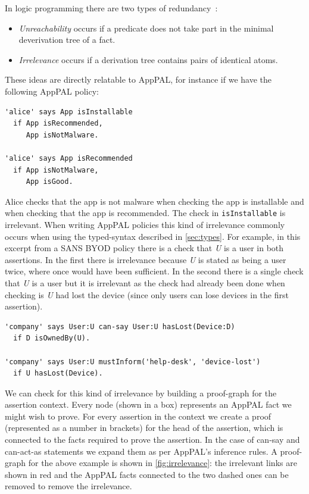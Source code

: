 \documentclass[a4paper]{scrartcl}
\begin{document}
In logic programming there are two types of redundancy~\cite{alon_levy_constraints_1992}:
\begin{itemize}
\item \emph{Unreachability} occurs if a predicate does not take part in the
  minimal deverivation tree of a fact.
\item \emph{Irrelevance} occurs if a derivation tree contains pairs of identical atoms.
\end{itemize}

These ideas are directly relatable to AppPAL, for instance if we have the
following AppPAL policy:

\begin{lstlisting}
'alice' says App isInstallable
  if App isRecommended,
     App isNotMalware.

'alice' says App isRecommended
  if App isNotMalware,
     App isGood.
\end{lstlisting}

Alice checks that the app is not malware when checking the app is
installable and when checking that the app is recommended.  The check in
\texttt{isInstallable} is irrelevant.  When writing AppPAL policies this kind of
irrelevance commonly occurs when using the typed-syntax described in
\autoref{sec:types}. For example, in this excerpt from a SANS BYOD policy there
is a check that \emph{U} is a user in both assertions.  In the first there is
irrelevance because \emph{U} is stated as being a user twice, where once would
have been sufficient.  In the second there is a single check that \emph{U} is a
user but it is irrelevant as the check had already been done when checking is
\emph{U} had lost the device (since only users can lose devices in the first assertion).

\begin{lstlisting}
'company' says User:U can-say User:U hasLost(Device:D)
  if D isOwnedBy(U).

'company' says User:U mustInform('help-desk', 'device-lost')
  if U hasLost(Device).
\end{lstlisting}

We can check for this kind of irrelevance by building a proof-graph for the
assertion context.  Every node (shown in a box) represents an AppPAL fact we
might wish to prove.  For every assertion in the context we create a proof
(represented as a number in brackets) for the head of the assertion, which is
connected to the facts required to prove the assertion.  In the case of can-say
and can-act-as statements we expand them as per AppPAL's inference rules.
A proof-graph for the above example is shown in \autoref{fig:irrelevance}: the
irrelevant links are shown in red and the AppPAL facts connected to the two
dashed ones can be removed to remove the irrelevance.
\end{document}
